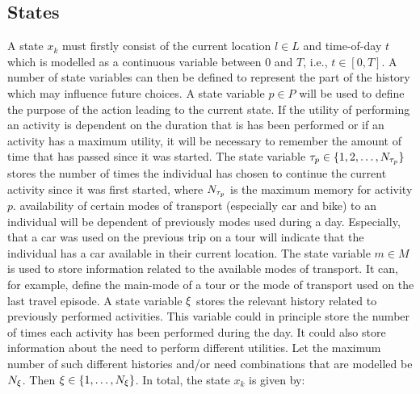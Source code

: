 \subsection{States}
 A state $x_k$ must firstly consist of the current location $l \in L$ and time-of-day $t$ which is modelled as a continuous variable between 0 and $T$, i.e., $t\in [0,T]$. A number of state variables can then be defined to represent the part of the history which may influence future choices. 
A state variable $p \in P$ will be used to define the purpose of the action leading to the current state. If the utility of performing an activity is dependent on the duration that is has been performed or if an activity has a maximum utility, it will be necessary to remember the amount of time that has passed since it was started. The state variable $\tau_p \in \{1,2,\dots,N_{\tau_p} \}$ stores the number of times the individual has chosen to continue the current activity since it was first started, where $N_{\tau_p}$ is the maximum memory for activity $p$. availability of certain modes of transport (especially car and bike) to an individual will be dependent of previously modes used during a day. Especially, that a car was used on the previous trip on a tour will indicate that the individual has a car available in their current location. The state variable $m \in M$ is used to store information related to the available modes of transport. It can, for example, define the main-mode of a tour or the mode of transport used on the last travel episode.
A state variable $\xi$ stores the relevant history related to previously performed activities. This variable could in principle store the number of times each activity has been performed during the day. It could also store information about the need to perform different utilities. Let the maximum number of such different histories and/or need combinations that are modelled be $N_\xi$. Then $\xi\in\{1,\dots,N_\xi \}$. In total, the state $x_k$ is given by:
